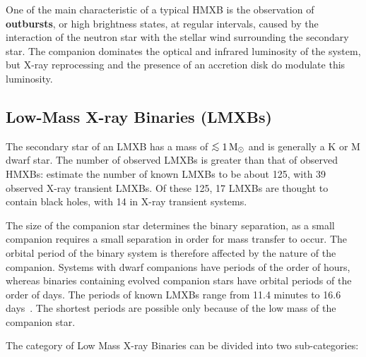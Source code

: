 \vspace{\myparskip}

One of the main characteristic of a typical HMXB is the observation of
\textbf{outbursts}, or high brightness states, at regular intervals,
caused by the interaction of the neutron star with the stellar wind
surrounding the
secondary star. The companion dominates the optical and infrared
luminosity of the system, but X-ray reprocessing and the presence of an accretion disk do modulate
this luminosity. %


\subsection{Low-Mass X-ray Binaries (LMXBs)}\label{cha:Introduction:sec:X-rayBinaries:subsec:LMXBs}

The secondary star of an LMXB has a mass of $\lsim 1\,\mathrm{M}\sun$
and is generally a K or M dwarf star. The number of observed LMXBs is greater than that of observed HMXBs: %
estimate the number of known LMXBs to be about 125, with 39 observed
X-ray transient LMXBs. Of these 125, 17 LMXBs are thought to contain black holes, with 14 in X-ray transient systems. %

\vspace{\myparskip}

The size of the companion star determines the binary separation, as a
small companion requires a small separation in order for mass transfer to
occur. The orbital period of the binary system is therefore affected by the
nature of the companion. Systems with dwarf companions have
periods of the order of hours, whereas binaries containing evolved
companion stars have orbital periods of the order of days. The periods of known LMXBs range from 11.4 minutes to 16.6 days~\cite{VanParadijs:1995}. %
The shortest periods are possible only because of the low mass of the
companion star. %

\vspace{\myparskip}

The category of Low Mass X-ray Binaries can be divided into two
sub-categories:

